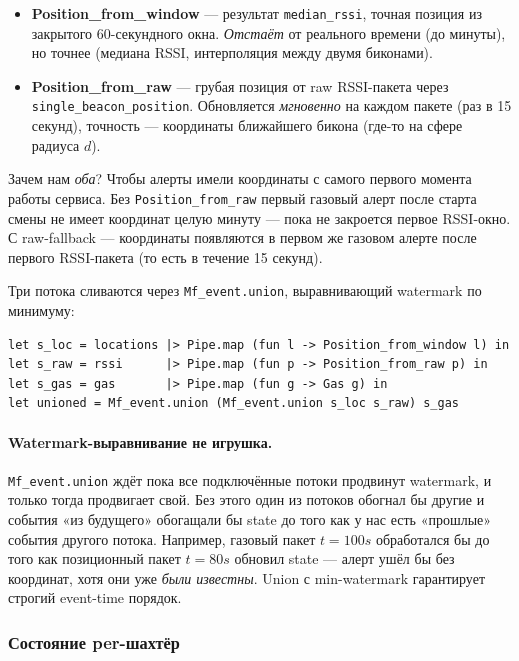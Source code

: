 \begin{itemize}
\item \textbf{Position\_from\_window} --- результат
\texttt{median\_rssi}, точная позиция из закрытого 60-секундного
окна. \emph{Отстаёт} от реального времени (до минуты), но точнее
(медиана RSSI, интерполяция между двумя биконами).
\item \textbf{Position\_from\_raw} --- грубая позиция от raw
RSSI-пакета через \texttt{single\_beacon\_position}. Обновляется
\emph{мгновенно} на каждом пакете (раз в 15 секунд), точность ---
координаты ближайшего бикона (где-то на сфере радиуса $d$).
\end{itemize}

Зачем нам \emph{оба}? Чтобы алерты имели координаты с самого первого
момента работы сервиса. Без \texttt{Position\_from\_raw} первый
газовый алерт после старта смены не имеет координат целую минуту ---
пока не закроется первое RSSI-окно. С raw-fallback --- координаты
появляются в первом же газовом алерте после первого RSSI-пакета (то
есть в течение 15 секунд).

Три потока сливаются через \texttt{Mf\_event.union}, выравнивающий
watermark по минимуму:

\begin{lstlisting}
let s_loc = locations |> Pipe.map (fun l -> Position_from_window l) in
let s_raw = rssi      |> Pipe.map (fun p -> Position_from_raw p) in
let s_gas = gas       |> Pipe.map (fun g -> Gas g) in
let unioned = Mf_event.union (Mf_event.union s_loc s_raw) s_gas
\end{lstlisting}

\paragraph{Watermark-выравнивание не игрушка.}
\texttt{Mf\_event.union} ждёт пока все подключённые потоки продвинут
watermark, и только тогда продвигает свой. Без этого один из потоков
обогнал бы другие и события «из будущего» обогащали бы state до того
как у нас есть «прошлые» события другого потока. Например, газовый
пакет $t=100s$ обработался бы до того как позиционный пакет $t=80s$
обновил state --- алерт ушёл бы без координат, хотя они уже
\emph{были известны}. Union с min-watermark гарантирует строгий
event-time порядок.

\subsubsection{Состояние per-шахтёр}

